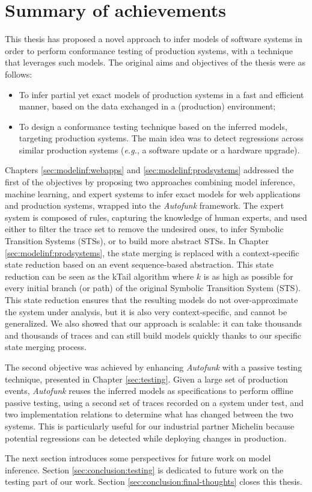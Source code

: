 \section{Summary of achievements}

This thesis has proposed a novel approach to infer models of
software systems in order to perform conformance testing of
production systems, with a technique that leverages such models.
The original aims and objectives of the thesis were as follows:

\begin{itemize}
    \item To infer partial yet exact models of production systems
        in a fast and efficient manner, based on the data
        exchanged in a (production) environment;

    \item To design a conformance testing technique based on the
        inferred models, targeting production systems. The main
        idea was to detect regressions across similar production
        systems (\emph{e.g.}, a software update or a hardware
        upgrade).
\end{itemize}

Chapters \ref{sec:modelinf:webapps} and
\ref{sec:modelinf:prodsystems} addressed the first of the
objectives by proposing two approaches combining model inference,
machine learning, and expert systems to infer exact models for
web applications and production systems, wrapped into the
\textit{Autofunk} framework.  The expert system is composed of
rules, capturing the knowledge of human experts, and used either
to filter the trace set to remove the undesired ones, to infer
Symbolic Transition Systems (STSs), or to build
more abstract STSs. In Chapter \ref{sec:modelinf:prodsystems},
the state merging is replaced with a context-specific state
reduction based on an event sequence-based abstraction. This state
reduction can be seen as the kTail algorithm \cite{5009015} where
$k$ is as high as possible for every initial branch (or path) of
the original Symbolic Transition System (STS). This state
reduction ensures that the resulting models do not
over-approximate the system under analysis, but it is also very
context-specific, and cannot be generalized. We also showed that
our approach is scalable: it can take thousands and thousands of
traces and can still build models quickly thanks to our specific
state merging process.

The second objective was achieved by enhancing \textit{Autofunk}
with a passive testing technique, presented in Chapter
\ref{sec:testing}. Given a large set of production events,
\textit{Autofunk} reuses the inferred models as specifications to
perform offline passive testing, using a second set of traces
recorded on a system under test, and two implementation relations
to determine what has changed between the two systems. This is
particularly useful for our industrial partner Michelin because
potential regressions can be detected while deploying changes in
production.

The next section introduces some perspectives for future work on
model inference. Section \ref{sec:conclusion:testing} is
dedicated to future work on the testing part of our work. Section
\ref{sec:conclusion:final-thoughts} closes this thesis.
